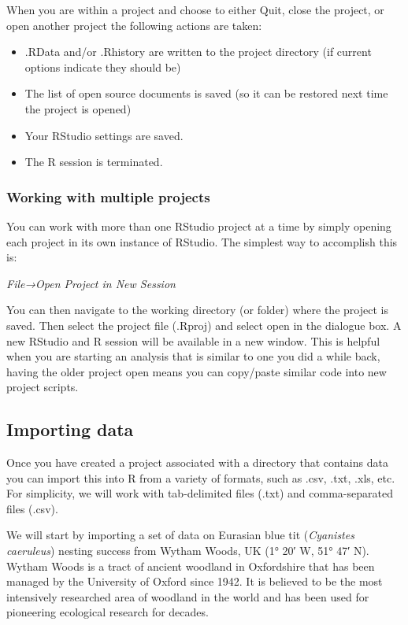 \documentclass[
]{book}
\providecommand{\tightlist}{%
  \setlength{\itemsep}{0pt}\setlength{\parskip}{0pt}}
\begin{document}
When you are within a project and choose to either Quit, close the
project, or open another project the following actions are taken:

\begin{itemize}
\tightlist
\item
  .RData and/or .Rhistory are written to the project directory (if
  current options indicate they should be)
\item
  The list of open source documents is saved (so it can be restored next
  time the project is opened)
\item
  Your RStudio settings are saved.
\item
  The R session is terminated.
\end{itemize}

\hypertarget{multiproj}{%
\subsubsection{Working with multiple projects}\label{multiproj}}

You can work with more than one RStudio project at a time by simply
opening each project in its own instance of RStudio. The simplest way to
accomplish this is:

\emph{File→Open Project in New Session}

You can then navigate to the working directory (or folder) where the
project is saved. Then select the project file (.Rproj) and select open
in the dialogue box. A new RStudio and R session will be available in a
new window. This is helpful when you are starting an analysis that is
similar to one you did a while back, having the older project open means
you can copy/paste similar code into new project scripts.

\hypertarget{import}{%
\subsection{Importing data}\label{import}}

Once you have created a project associated with a directory that
contains data you can import this into R from a variety of formats, such
as .csv, .txt, .xls, etc. For simplicity, we will work with
tab-delimited files (.txt) and comma-separated files (.csv).

We will start by importing a set of data on Eurasian blue tit
(\emph{Cyanistes caeruleus}) nesting success from Wytham Woods, UK (1°
20′ W, 51° 47′ N). Wytham Woods is a tract of ancient woodland in
Oxfordshire that has been managed by the University of Oxford since
1942. It is believed to be the most intensively researched area of
woodland in the world and has been used for pioneering ecological
research for decades.
\end{document}
